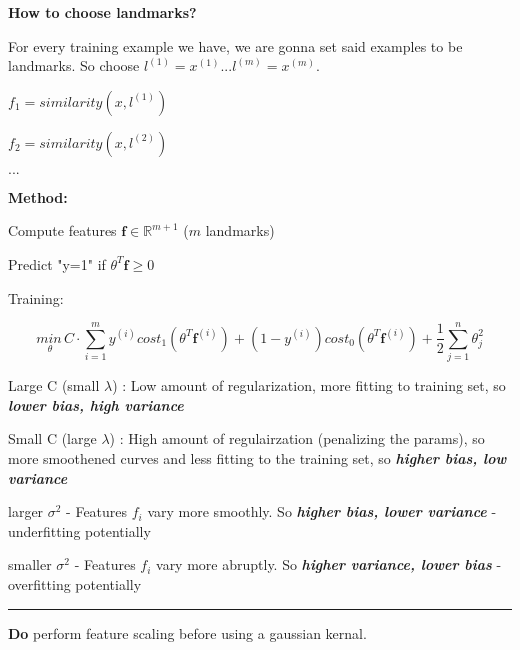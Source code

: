 \documentclass{article}
\begin{document}
\hspace{}

\textbf{How to choose landmarks?}
\begin{mybox}
For every training example we have, we are gonna set said examples to be landmarks. So choose $l^{(1)} = x^{(1)} ... l^{(m)} = x^{(m)}$. 

$f_1 = similarity(x, l^{(1)})$

$f_2 = similarity(x, l^{(2)})$

$...$
\end{mybox}



\textbf{Method: }

\begin{mybox}
Compute features $\textbf{f} \in \mathbb{R}^{m+1}$ ($m$ landmarks)

Predict "y=1" if $\theta^T \textbf{f} \geq 0$

Training:

\begin{equation}
    \underset{\theta}{min \,} C \cdot \sum_{i=1}^m y^{(i)} cost_1 (\theta^T \textbf{f}^{(i)}) + (1 - y^{(i)}) cost_0 (\theta^T \textbf{f}^{(i)}) + \frac{1}{2} \sum_{j=1}^n \theta_j^2
\end{equation}

\end{mybox}



Large C (small $\lambda$) : Low amount of regularization, more fitting to training set, so \textbf{\textit{lower bias, high variance}}

Small C (large $\lambda$) : High amount of regulairzation (penalizing the params), so more smoothened curves and less fitting to the training set, so \textbf{\textit{higher bias, low variance}}

\hspace{}

larger $\sigma^2$ - Features $f_i$ vary more smoothly. So \textbf{\textit{higher bias, lower variance}} - underfitting potentially

smaller $\sigma^2$ - Features $f_i$ vary more abruptly. So \textbf{\textit{higher variance, lower bias}} - overfitting potentially



\par\noindent\rule{\textwidth}{0.2pt}

\textbf{Do} perform feature scaling before using a gaussian kernal.
\end{document}
